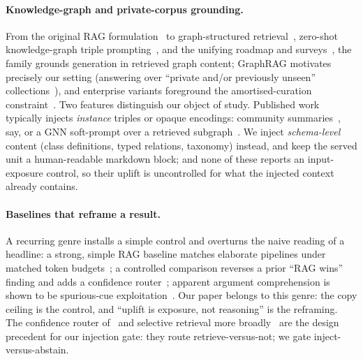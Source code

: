 \documentclass[10pt,twocolumn]{article}
\begin{document}
\paragraph{Knowledge-graph and private-corpus grounding.}
From the original RAG formulation~\cite{lewis2020rag} to graph-structured
retrieval~\cite{edge2024graphrag,guo2024lightrag}, zero-shot knowledge-graph triple
prompting~\cite{baek2023kaping}, and the unifying roadmap and
surveys~\cite{pan2024unifying,peng2024graphragsurvey}, the family grounds generation in retrieved
graph content; GraphRAG motivates precisely our setting (answering over ``private and/or
previously unseen'' collections~\cite{edge2024graphrag}), and enterprise variants foreground the
amortised-curation constraint~\cite{jiang2025practicalgraphrag}. Two features distinguish our object
of study. Published work typically injects \emph{instance} triples or opaque
encodings: community summaries~\cite{edge2024graphrag}, say, or a GNN soft-prompt over a retrieved
subgraph~\cite{he2024gretriever}. We inject \emph{schema-level} content (class definitions,
typed relations, taxonomy) instead, and keep the served unit a human-readable markdown block; and none of
these reports an input-exposure control, so their uplift is uncontrolled for what the injected
context already contains.

\paragraph{Baselines that reframe a result.}
A recurring genre installs a simple control and overturns the naive reading of a headline: a strong,
simple RAG baseline matches elaborate pipelines under matched token
budgets~\cite{laitenberger2025stronger}; a controlled comparison reverses a prior ``RAG wins''
finding and adds a confidence router~\cite{li2024ragorlongcontext}; apparent argument comprehension
is shown to be spurious-cue exploitation~\cite{niven2019probing}. Our paper belongs to this genre:
the copy ceiling is the control, and ``uplift is exposure, not reasoning'' is the reframing. The
confidence router of~\textcite{li2024ragorlongcontext} and selective retrieval more
broadly~\cite{asai2024selfrag,jeong2024adaptiverag,mallen2023trust} are the design precedent for our
injection gate: they route retrieve-versus-not; we gate inject-versus-abstain.
\end{document}
